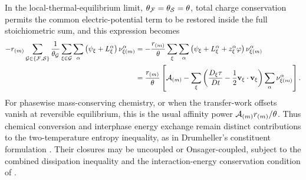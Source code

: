 In the local-thermal-equilibrium limit,
\(\theta_{\mathcal{F}}=\theta_{\mathcal{S}}=\theta\), total charge conservation permits the
common electric-potential term to be restored inside the full stoichiometric
sum, and this expression becomes
%
\begin{align}
	-
	r_{(m)}
	\sum_{\mathcal{G}\in\{\mathcal{F},\mathcal{S}\}}
	\frac{1}{\theta_{\mathcal{G}}}
	\sum_{\xi\in\mathcal{G}}\sum_\alpha
	\left(
	\psi_\xi+L_\xi^\alpha
		\right)
		\nu_{\xi (m)}^\alpha
	&=
		-\frac{r_{(m)}}{\theta}
	\sum_\xi\sum_\alpha
	\left(
		\psi_\xi+L_\xi^\alpha+z_\xi^\alpha\varphi
	\right)
	\nu_{\xi (m)}^\alpha
	\notag \\
	&=
		\frac{r_{(m)}}{\theta}
	\left[
		\mathcal{A}_{(m)}
		-
		\sum_\xi
		\left(
			\frac{D_\xi\tau}{Dt}
			-
			\frac{1}{2}
			\mathbf{v}_\xi\cdot\mathbf{v}_\xi
		\right)
		\sum_\alpha\nu_{\xi (m)}^\alpha
	\right].
	\label{eq:MC_reaction_power_local_thermal_equilibrium}
\end{align}
%
For phasewise mass-conserving chemistry, or when the transfer-work offsets
vanish at reversible equilibrium, this is the usual affinity power
\(\mathcal{A}_{(m)}r_{(m)}/\theta\).
Thus chemical conversion and interphase energy exchange remain distinct
contributions to the two-temperature entropy inequality, as in Drumheller's
constituent formulation \cite[eq.~(88)]{drumheller2000}.  Their closures may be
uncoupled or Onsager-coupled, subject to the combined dissipation inequality
and the interaction-energy conservation condition of
.

